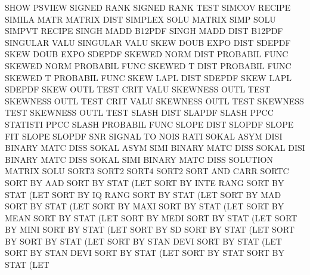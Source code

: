 SHOW                                    PSVIEW
SIGNED   RANK                           SIGNED   RANK TEST
SIMCOV                                  RECIPE
SIMILA   MATR                           MATRIX   DIST
SIMPLEX  SOLU                           MATRIX   SIMP SOLU
SIMPVT                                  RECIPE
SINGH    MADD                           B12PDF
SINGH    MADD DIST                      B12PDF
SINGULAR VALU                           SINGULAR VALU
SKEW     DOUB EXPO DIST                 SDEPDF
SKEW     DOUB EXPO                      SDEPDF
SKEWED   NORM DIST                      PROBABIL FUNC
SKEWED   NORM                           PROBABIL FUNC
SKEWED   T    DIST                      PROBABIL FUNC
SKEWED   T                              PROBABIL FUNC
SKEW     LAPL DIST                      SDEPDF
SKEW     LAPL                           SDEPDF
SKEW     OUTL TEST CRIT VALU            SKEWNESS OUTL TEST
SKEWNESS OUTL TEST CRIT VALU            SKEWNESS OUTL TEST
SKEWNESS TEST                           SKEWNESS OUTL TEST
SLASH    DIST                           SLAPDF
SLASH    PPCC                           STATISTI PPCC
SLASH                                   PROBABIL FUNC
SLOPE    DIST                           SLOPDF
SLOPE                                   FIT
SLOPE                                   SLOPDF
SNR                                     SIGNAL   TO   NOIS RATI
SOKAL    ASYM DISI                      BINARY   MATC DISS
SOKAL    ASYM SIMI                      BINARY   MATC DISS
SOKAL    DISI                           BINARY   MATC DISS
SOKAL    SIMI                           BINARY   MATC DISS
SOLUTION                                MATRIX   SOLU
SORT3                                   SORT2
SORT4                                   SORT2
SORT     AND  CARR                      SORTC
SORT     BY   AAD                       SORT     BY   STAT (LET
SORT     BY   INTE RANG                 SORT     BY   STAT (LET
SORT     BY   IQ   RANG                 SORT     BY   STAT (LET
SORT     BY   MAD                       SORT     BY   STAT (LET
SORT     BY   MAXI                      SORT     BY   STAT (LET
SORT     BY   MEAN                      SORT     BY   STAT (LET
SORT     BY   MEDI                      SORT     BY   STAT (LET
SORT     BY   MINI                      SORT     BY   STAT (LET
SORT     BY   SD                        SORT     BY   STAT (LET
SORT     BY                             SORT     BY   STAT (LET
SORT     BY   STAN DEVI                 SORT     BY   STAT (LET
SORT     BY   STAN DEVI                 SORT     BY   STAT (LET
SORT     BY   STAT                      SORT     BY   STAT (LET
